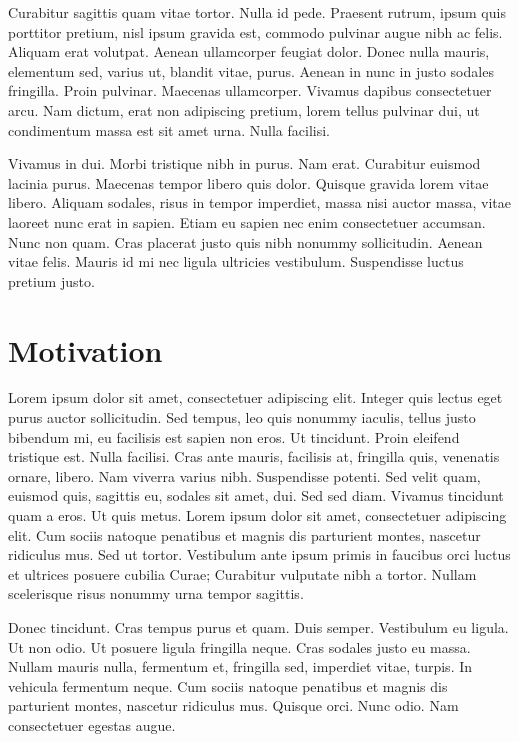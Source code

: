 Curabitur sagittis quam vitae tortor. Nulla id pede. Praesent rutrum, ipsum quis porttitor pretium, nisl ipsum gravida est, commodo pulvinar augue nibh ac felis. Aliquam erat volutpat. Aenean ullamcorper feugiat dolor. Donec nulla mauris, elementum sed, varius ut, blandit vitae, purus. Aenean in nunc in justo sodales fringilla. Proin pulvinar. Maecenas ullamcorper. Vivamus dapibus consectetuer arcu. Nam dictum, erat non adipiscing pretium, lorem tellus pulvinar dui, ut condimentum massa est sit amet urna. Nulla facilisi.

Vivamus in dui. Morbi tristique nibh in purus. Nam erat. Curabitur euismod lacinia purus. Maecenas tempor libero quis dolor. Quisque gravida lorem vitae libero. Aliquam sodales, risus in tempor imperdiet, massa nisi auctor massa, vitae laoreet nunc erat in sapien. Etiam eu sapien nec enim consectetuer accumsan. Nunc non quam. Cras placerat justo quis nibh nonummy sollicitudin. Aenean vitae felis. Mauris id mi nec ligula ultricies vestibulum. Suspendisse luctus pretium justo. 

\section{Motivation}
\label{ch:1}
Lorem ipsum dolor sit amet, consectetuer adipiscing elit. Integer quis lectus eget purus auctor sollicitudin. Sed tempus, leo quis nonummy iaculis, tellus justo bibendum mi, eu facilisis est sapien non eros. Ut tincidunt. Proin eleifend tristique est. Nulla facilisi. Cras ante mauris, facilisis at, fringilla quis, venenatis ornare, libero. Nam viverra varius nibh. Suspendisse potenti. Sed velit quam, euismod quis, sagittis eu, sodales sit amet, dui. Sed sed diam. Vivamus tincidunt quam a eros. Ut quis metus. Lorem ipsum dolor sit amet, consectetuer adipiscing elit. Cum sociis natoque penatibus et magnis dis parturient montes, nascetur ridiculus mus. Sed ut tortor. Vestibulum ante ipsum primis in faucibus orci luctus et ultrices posuere cubilia Curae; Curabitur vulputate nibh a tortor. Nullam scelerisque risus nonummy urna tempor sagittis.

Donec tincidunt. Cras tempus purus et quam. Duis semper. Vestibulum eu ligula. Ut non odio. Ut posuere ligula fringilla neque. Cras sodales justo eu massa. Nullam mauris nulla, fermentum et, fringilla sed, imperdiet vitae, turpis. In vehicula fermentum neque. Cum sociis natoque penatibus et magnis dis parturient montes, nascetur ridiculus mus. Quisque orci. Nunc odio. Nam consectetuer egestas augue.

